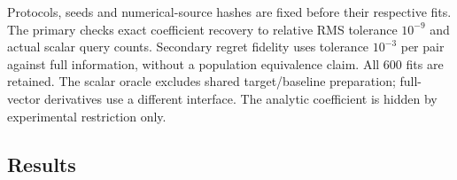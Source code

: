 Protocols, seeds and numerical-source hashes are fixed before their
respective fits. The primary checks exact coefficient recovery to
relative RMS tolerance $10^{-9}$ and actual scalar query counts.
Secondary regret fidelity uses tolerance $10^{-3}$ per pair against
full information, without a population equivalence claim. All 600
fits are retained. The scalar oracle excludes shared target/baseline
preparation; full-vector derivatives use a different interface.
The analytic coefficient is hidden by experimental restriction only.

\subsection{Results}

